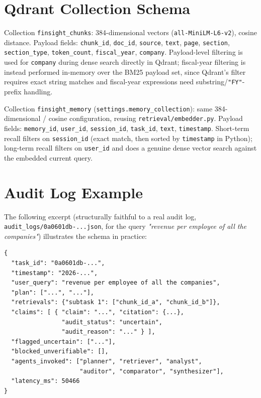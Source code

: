\documentclass[11pt,a4paper]{report}
\newcommand{\code}[1]{\texttt{#1}}
\newcommand{\file}[1]{\texttt{\small #1}}
\begin{document}
\section{Qdrant Collection Schema}

Collection \code{finsight\_chunks}: 384-dimensional vectors
(\code{all-MiniLM-L6-v2}), cosine distance. Payload fields: \code{chunk\_id},
\code{doc\_id}, \code{source}, \code{text}, \code{page}, \code{section},
\code{section\_type}, \code{token\_count}, \code{fiscal\_year}, \code{company}.
Payload-level filtering is used for \code{company} during dense search directly in
Qdrant; fiscal-year filtering is instead performed in-memory over the BM25 payload set,
since Qdrant's filter requires exact string matches and fiscal-year expressions need
substring/\code{"FY"}-prefix handling.

Collection \code{finsight\_memory} (\code{settings.memory\_collection}): same
384-dimensional / cosine configuration, reusing \code{retrieval/embedder.py}.
Payload fields: \code{memory\_id}, \code{user\_id}, \code{session\_id},
\code{task\_id}, \code{text}, \code{timestamp}. Short-term recall filters on
\code{session\_id} (exact match, then sorted by \code{timestamp} in Python);
long-term recall filters on \code{user\_id} and does a genuine dense vector
search against the embedded current query.

\section{Audit Log Example}
\label{sec:auditlog}

The following excerpt (structurally faithful to a real audit log,
\file{audit\_logs/0a0601db-...json}, for the query \emph{"revenue per employee of all
the companies"}) illustrates the schema in practice:

\begin{lstlisting}[language=jsonlang]
{
  "task_id": "0a0601db-...",
  "timestamp": "2026-...",
  "user_query": "revenue per employee of all the companies",
  "plan": ["...", "..."],
  "retrievals": {"subtask 1": ["chunk_id_a", "chunk_id_b"]},
  "claims": [ { "claim": "...", "citation": {...},
                "audit_status": "uncertain",
                "audit_reason": "..." } ],
  "flagged_uncertain": ["..."],
  "blocked_unverifiable": [],
  "agents_invoked": ["planner", "retriever", "analyst",
                     "auditor", "comparator", "synthesizer"],
  "latency_ms": 50466
}
\end{lstlisting}
\end{document}
